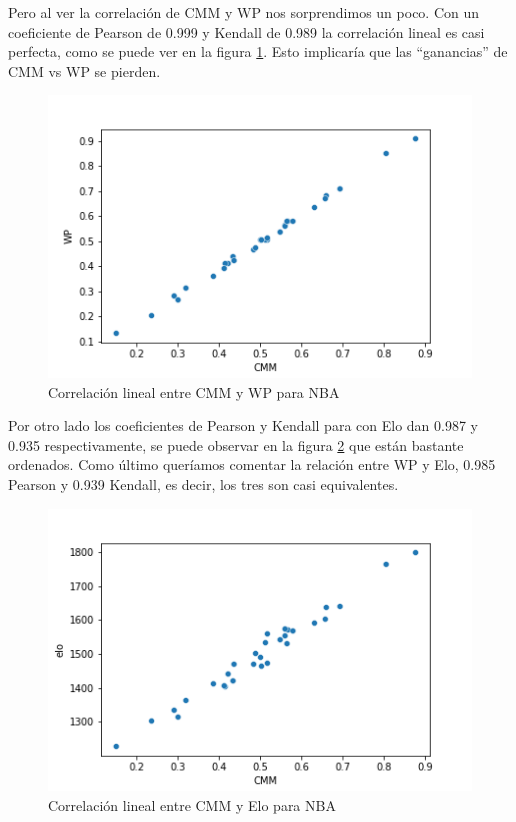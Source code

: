 Pero al ver la correlación de CMM y WP nos sorprendimos un poco. Con un coeficiente de Pearson de 0.999 y Kendall de 0.989 la correlación lineal es casi perfecta, como se puede ver en la figura \ref{fig:sc__nba_cmm_wp}. Esto implicaría que las ``ganancias'' de CMM vs WP se pierden. 

\begin{figure}[h]
 \centering
 \includegraphics[scale=0.8]{imagenes/scatterplot_nba_CMM_WP.png}
 \caption{Correlación lineal entre CMM y WP para NBA}
 \label{fig:sc__nba_cmm_wp}
\end{figure}

Por otro lado los coeficientes de Pearson y Kendall para con Elo dan 0.987 y 0.935 respectivamente, se puede observar en la figura \ref{fig:sc__nba_cmm_elo} que están bastante ordenados. Como último queríamos comentar la relación entre WP y Elo, 0.985 Pearson y 0.939 Kendall, es decir, los tres son casi equivalentes.

\begin{figure}[h]
 \centering
 \includegraphics[scale=0.8]{imagenes/scatterplot_nba_CMM_Elo.png}
 \caption{Correlación lineal entre CMM y Elo para NBA}
 \label{fig:sc__nba_cmm_elo}
\end{figure}

